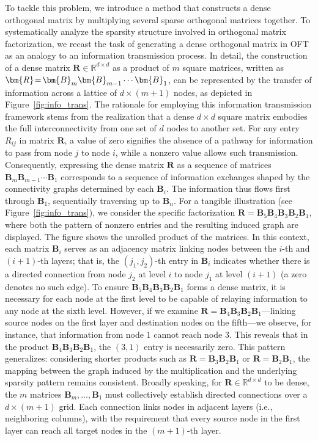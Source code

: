 To tackle this problem, we introduce a method that constructs a dense orthogonal matrix by multiplying several sparse orthogonal matrices together. To systematically analyze the sparsity structure involved in orthogonal matrix factorization, we recast the task of generating a dense orthogonal matrix in OFT as an analogy to an information transmission process. In detail, the construction of a dense matrix $\bm{R}\in\mathbb{R}^{d\times d}$ as a product of $m$ square matrices, written as $\thickmuskip=2mu \medmuskip=2mu \bm{R}=\bm{B}_m\bm{B}_{m-1}\cdots\bm{B}_1$, can be represented by the transfer of information across a lattice of $d\times (m+1)$ nodes, as depicted in Figure~\ref{fig:info_trans}. The rationale for employing this information transmission framework stems from the realization that a dense $d \times d$ square matrix embodies the full interconnectivity from one set of $d$ nodes to another set. For any entry $R_{ij}$ in matrix $\bm{R}$, a value of zero signifies the absence of a pathway for information to pass from node $j$ to node $i$, while a nonzero value allows such transmission. Consequently, expressing the dense matrix $\bm{R}$ as a sequence of matrices $\bm{B}_m\bm{B}_{m-1}\cdots\bm{B}_1$ corresponds to a sequence of information exchanges shaped by the connectivity graphs determined by each $\bm{B}_i$. The information thus flows first through $\bm{B}_1$, sequentially traversing up to $\bm{B}_n$. For a tangible illustration (see Figure~\ref{fig:info_trans}), we consider the specific factorization $\bm{R}=\bm{B}_5\bm{B}_4\bm{B}_3\bm{B}_2\bm{B}_1$, where both the pattern of nonzero entries and the resulting induced graph are displayed. The figure shows the unrolled product of the matrices. In this context, each matrix $\bm{B}_i$ serves as an adjacency matrix linking nodes between the $i$-th and $(i+1)$-th layers; that is, the $(j_1, j_2)$-th entry in $\bm{B}_i$ indicates whether there is a directed connection from node $j_2$ at level $i$ to node $j_1$ at level $(i+1)$ (a zero denotes no such edge). To ensure $\bm{B}_5\bm{B}_4\bm{B}_3\bm{B}_2\bm{B}_1$ forms a dense matrix, it is necessary for each node at the first level to be capable of relaying information to any node at the sixth level. However, if we examine $\bm{R}=\bm{B}_4\bm{B}_3\bm{B}_2\bm{B}_1$—linking source nodes on the first layer and destination nodes on the fifth—we observe, for instance, that information from node $1$ cannot reach node $3$. This reveals that in the product $\bm{B}_4\bm{B}_3\bm{B}_2\bm{B}_1$, the $(3,1)$ entry is necessarily zero. This pattern generalizes: considering shorter products such as $\bm{R}=\bm{B}_3\bm{B}_2\bm{B}_1$ or $\bm{R}=\bm{B}_2\bm{B}_1$, the mapping between the graph induced by the multiplication and the underlying sparsity pattern remains consistent. Broadly speaking, for $\bm{R}\in\mathbb{R}^{d\times d}$ to be dense, the $m$ matrices $\bm{B}_m,\ldots,\bm{B}_1$ must collectively establish directed connections over a $d\times (m+1)$ grid. Each connection links nodes in adjacent layers (i.e., neighboring columns), with the requirement that every source node in the first layer can reach all target nodes in the $(m+1)$-th layer.

